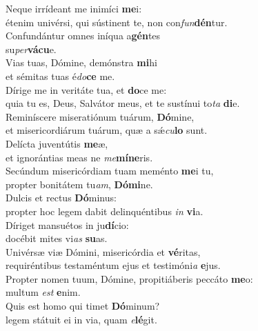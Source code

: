 \evenverse Neque irrídeant me inimíci \textbf{me}i:~\*\\
\evenverse étenim univérsi, qui sústinent te, non con\textit{fun}\textbf{dén}tur.\\
\oddverse Confundántur omnes iníqua a\textbf{gén}tes~\*\\
\oddverse su\textit{per}\textbf{vá}\textbf{cu}e.\\
\evenverse Vias tuas, Dómine, demónstra \textbf{mi}hi~\*\\
\evenverse et sémitas tuas é\textit{do}\textbf{ce} me.\\
\oddverse Dírige me in veritáte tua, et \textbf{do}ce me:~\*\\
\oddverse quia tu es, Deus, Salvátor meus, et te sustínui to\textit{ta} \textbf{di}e.\\
\evenverse Reminíscere miseratiónum tuárum, \textbf{Dó}mine,~\*\\
\evenverse et misericordiárum tuárum, quæ a sǽ\textit{cu}\textbf{lo} sunt.\\
\oddverse Delícta juventútis \textbf{me}æ,~\*\\
\oddverse et ignorántias meas ne \textit{me}\textbf{mí}\textbf{ne}ris.\\
\evenverse Secúndum misericórdiam tuam meménto \textbf{me}i tu,~\*\\
\evenverse propter bonitátem tu\textit{am}, \textbf{Dó}\textbf{mi}ne.\\
\oddverse Dulcis et rectus \textbf{Dó}minus:~\*\\
\oddverse propter hoc legem dabit delinquéntibus \textit{in} \textbf{vi}a.\\
\evenverse Díriget mansuétos in ju\textbf{dí}cio:~\*\\
\evenverse docébit mites vi\textit{as} \textbf{su}as.\\
\oddverse Univérsæ viæ Dómini, misericórdia et \textbf{vé}ritas,~\*\\
\oddverse requiréntibus testaméntum ejus et testimóni\textit{a} \textbf{e}jus.\\
\evenverse Propter nomen tuum, Dómine, propitiáberis peccáto \textbf{me}o:~\*\\
\evenverse multum \textit{est} \textbf{e}nim.\\
\oddverse Quis est homo qui timet \textbf{Dó}minum?~\*\\
\oddverse legem státuit ei in via, quam \textit{e}\textbf{lé}git.\\
